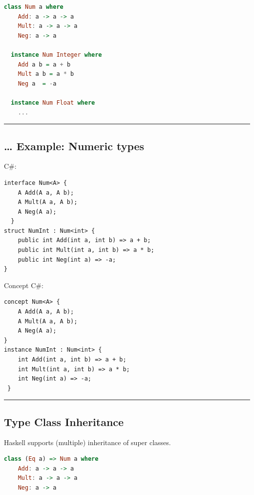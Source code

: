 \begin{lstlisting}[language=Haskell]
  class Num a where
    Add: a -> a -> a
    Mult: a -> a -> a
    Neg: a -> a
  
  instance Num Integer where
    Add a b = a + b
    Mult a b = a * b
    Neg a  = -a
  
  instance Num Float where 
    ...
\end{lstlisting}

\begin{center}\rule{0.5\linewidth}{\linethickness}\end{center}

\subsection{\ldots{} Example: Numeric
types}\label{example-numeric-types-1}

C\#:

\begin{lstlisting}
interface Num<A> {
    A Add(A a, A b);
    A Mult(A a, A b);
    A Neg(A a);
  }
struct NumInt : Num<int> {
    public int Add(int a, int b) => a + b; 
    public int Mult(int a, int b) => a * b; 
    public int Neg(int a) => -a;
}
\end{lstlisting}

Concept C\#:

\begin{lstlisting}
concept Num<A> {
    A Add(A a, A b);
    A Mult(A a, A b);
    A Neg(A a);
}
instance NumInt : Num<int> {
    int Add(int a, int b) => a + b; 
    int Mult(int a, int b) => a * b; 
    int Neg(int a) => -a;
 }      
\end{lstlisting}

\begin{center}\rule{0.5\linewidth}{\linethickness}\end{center}

\subsection{Type Class Inheritance}\label{type-class-inheritance}

Haskell supports (multiple) inheritance of super classes.

\begin{lstlisting}[language=Haskell]
  class (Eq a) => Num a where
    Add: a -> a -> a
    Mult: a -> a -> a
    Neg: a -> a
\end{lstlisting}

